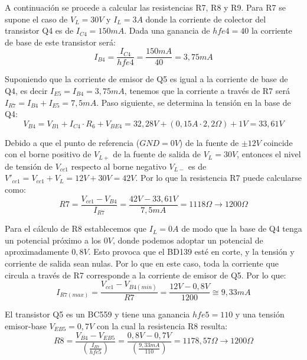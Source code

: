 A continuación se procede a calcular las resistencias R7, R8 y R9. Para R7 se supone el caso de $V_L=30 V$ y $I_L=3 A$ donde la corriente de colector del transistor Q4 es de $I_{C4}=150 mA$. Dada una ganancia de $hfe4=40$ la corriente de base de este transistor será:
\begin{equation}
I_{B4}=\frac{I_{C4}}{hfe4}=\frac{150mA}{40}=3,75mA
\end{equation}\par

Suponiendo que la corriente de emisor de Q5 es igual a la corriente de base de Q4, es decir $I_{E5}=I_{B4}=3,75mA$, tenemos que la corriente a través de R7 será $I_{R7}=I_{B4}+I_{E5}=7,5mA$. Paso siguiente, se determina la tensión en la base de Q4:
\begin{equation}
V_{B4}=V_{B1}+I_{C4}\cdot R_6+V_{BE4}=32,28V+(0,15A\cdot 2,2\Omega)+1V=33,61V
\end{equation}\par

Debido a que el punto de referencia ($GND=0V$) de la fuente de $\pm 12V$ coincide con el borne positivo de $V_{L+}$ de la fuente de salida de $V_L=30V$, entonces el nivel de tensión de $V_{cc1}$ respecto al borne negativo $V_{L-}$ es de $V'_{cc1}=V_{cc1}+V_L=12V+30V=42V$. Por lo que la resistencia R7 puede calcularse como:
\begin{equation}
R7=\frac{V_{cc1}-V_{B4}}{I_{R7}}=\frac{42V-33,61V}{7,5 mA}=1118 \Omega \to 1200\Omega
\end{equation}\par 

Para el cálculo de R8 establecemos que $I_L=0A$ de modo que la base de Q4 tenga un potencial próximo a los $0V$, donde podemos adoptar un potencial de aproximadamente $0,8V$. Esto provoca que el BD139 esté en corte, y la tensión y corriente de salida sean nulas. Por lo que en este caso, toda la corriente que circula a través de R7 corresponde a la corriente de emisor de Q5. Por lo que:
\begin{equation}
I_{R7(max)}=\frac{V_{cc1}-V_{B4(min)}}{R7}=\frac{12V-0,8V}{1200}\cong 9,33 mA
\end{equation} \par 
El transistor Q5 es un BC559 y tiene una ganancia $hfe5=110$ y una tensión emisor-base $V_{EB5}=0,7V$ con la cual la resistencia R8 resulta:
\begin{equation}
R8=\frac{V_{B4}-V_{EB5}}{(\frac{I_{R7}}{hfe5})}=\frac{0,8V-0,7V}{(\frac{9,33 mA}{110})}=1178,57\Omega \to 1200\Omega
\end{equation}\par 

